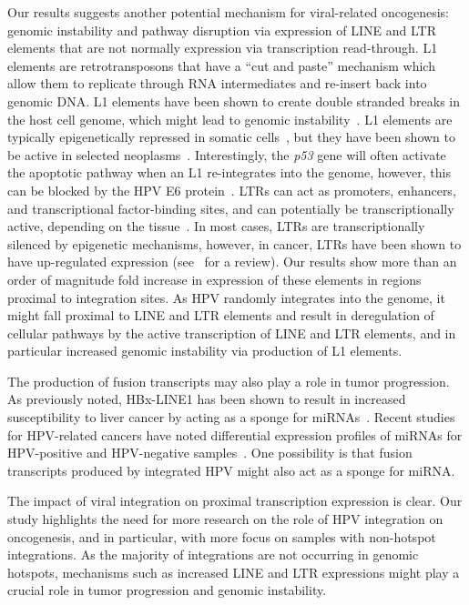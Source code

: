 \documentclass[10pt]{article}
\begin{document}
Our results suggests another potential mechanism for viral-related oncogenesis: genomic instability and pathway disruption via expression of LINE and LTR elements that are not normally expression via transcription read-through.  L1 elements are retrotransposons that have a ``cut and paste'' mechanism which allow them to replicate through RNA intermediates and re-insert back into genomic DNA.  L1 elements have been shown to create double stranded breaks in the host cell genome, which might lead to genomic instability~\cite{Gasior2006}.  L1 elements are typically epigenetically repressed in somatic cells~\cite{Kinomoto2007,Sigurdsson2012}, but they have been shown to be active in selected neoplasms~\cite{Rodic2013,Xiao-Jie2016}.  Interestingly, the \emph{p53} gene will often activate the apoptotic pathway when an L1 re-integrates into the genome, however, this can be blocked by the HPV E6 protein~\cite{Haoudi2004}.  LTRs can act as promoters, enhancers, and transcriptional factor-binding sites, and can potentially be transcriptionally active, depending on the tissue~\cite{Yu2013}.  In most cases, LTRs are transcriptionally silenced by epigenetic mechanisms, however, in cancer, LTRs have been shown to have up-regulated expression (see~\cite{Romanish2010} for a review).  Our results show more than an order of magnitude fold increase in expression of these elements in regions proximal to integration sites.  As HPV randomly integrates into the genome, it might fall proximal to LINE and LTR elements and result in deregulation of cellular pathways by the active transcription of LINE and LTR elements, and in particular increased genomic instability via production of L1 elements.  

The production of fusion transcripts may also play a role in tumor progression.  As previously noted, HBx-LINE1 has been shown to result in increased susceptibility to liver cancer by acting as a sponge for miRNAs~\cite{Lau2014,Liang2016}.  Recent studies for HPV-related cancers have noted differential expression profiles of miRNAs for HPV-positive and HPV-negative samples~\cite{Lajer2012,Gao2016}.  One possibility is that fusion transcripts produced by integrated HPV might also act as a sponge for miRNA.  

The impact of viral integration on proximal transcription expression is clear.  Our study highlights the need for more research on the role of HPV integration on oncogenesis, and in particular, with more focus on samples with non-hotspot integrations.  As the majority of integrations are not occurring in genomic hotspots, mechanisms such as increased LINE and LTR expressions might play a crucial role in tumor progression and genomic instability.  
\end{document}
